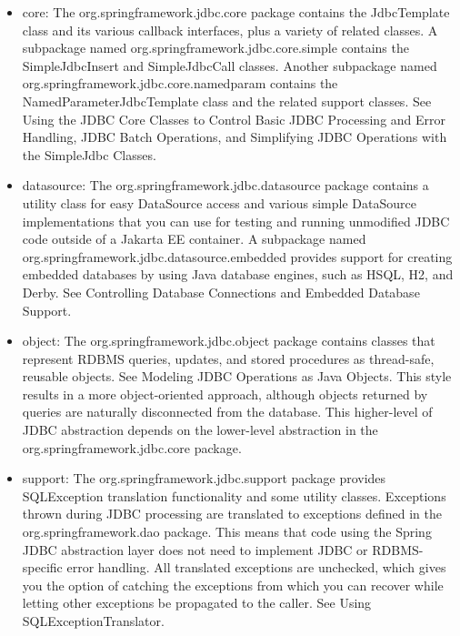 \documentclass{scrartcl}
\begin{document}
\begin{itemize}
    \item core: The org.springframework.jdbc.core package contains the JdbcTemplate class and its various callback interfaces, plus a variety of related classes. A subpackage named org.springframework.jdbc.core.simple contains the SimpleJdbcInsert and SimpleJdbcCall classes. Another subpackage named org.springframework.jdbc.core.namedparam contains the NamedParameterJdbcTemplate class and the related support classes. See Using the JDBC Core Classes to Control Basic JDBC Processing and Error Handling, JDBC Batch Operations, and Simplifying JDBC Operations with the SimpleJdbc Classes.

    \item datasource: The org.springframework.jdbc.datasource package contains a utility class for easy DataSource access and various simple DataSource implementations that you can use for testing and running unmodified JDBC code outside of a Jakarta EE container. A subpackage named org.springframework.jdbc.datasource.embedded provides support for creating embedded databases by using Java database engines, such as HSQL, H2, and Derby. See Controlling Database Connections and Embedded Database Support.

    \item object: The org.springframework.jdbc.object package contains classes that represent RDBMS queries, updates, and stored procedures as thread-safe, reusable objects. See Modeling JDBC Operations as Java Objects. This style results in a more object-oriented approach, although objects returned by queries are naturally disconnected from the database. This higher-level of JDBC abstraction depends on the lower-level abstraction in the org.springframework.jdbc.core package.

    \item support: The org.springframework.jdbc.support package provides SQLException translation functionality and some utility classes. Exceptions thrown during JDBC processing are translated to exceptions defined in the org.springframework.dao package. This means that code using the Spring JDBC abstraction layer does not need to implement JDBC or RDBMS-specific error handling. All translated exceptions are unchecked, which gives you the option of catching the exceptions from which you can recover while letting other exceptions be propagated to the caller. See Using SQLExceptionTranslator.
\end{itemize}
\end{document}
